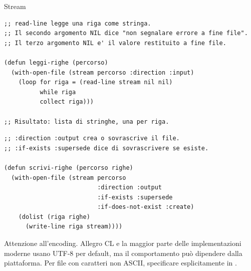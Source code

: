 \begin{concetto}{Stream}

\boxsep
{}
\end{concetto}

\begin{esempio}
\begin{lstlisting}
;; read-line legge una riga come stringa.
;; Il secondo argomento NIL dice "non segnalare errore a fine file".
;; Il terzo argomento NIL e' il valore restituito a fine file.

(defun leggi-righe (percorso)
  (with-open-file (stream percorso :direction :input)
    (loop for riga = (read-line stream nil nil)
          while riga
          collect riga)))

;; Risultato: lista di stringhe, una per riga.
\end{lstlisting}
\end{esempio}

\begin{esempio}
\begin{lstlisting}
;; :direction :output crea o sovrascrive il file.
;; :if-exists :supersede dice di sovrascrivere se esiste.

(defun scrivi-righe (percorso righe)
  (with-open-file (stream percorso
                          :direction :output
                          :if-exists :supersede
                          :if-does-not-exist :create)
    (dolist (riga righe)
      (write-line riga stream))))
\end{lstlisting}
\end{esempio}

\begin{attenzione}
Attenzione all'encoding. Allegro CL e la maggior parte
delle implementazioni moderne usano UTF-8 per default,
ma il comportamento può dipendere dalla piattaforma.
Per file con caratteri non ASCII, specificare esplicitamente
 in .
\end{attenzione}


